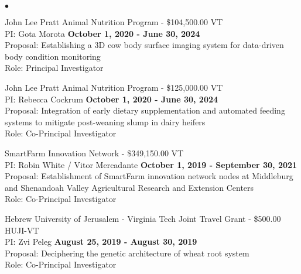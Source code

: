\documentclass[margin,line,10pt]{res}
\newenvironment{list2}{
  \begin{list}{$\bullet$}{%
      \setlength{\itemsep}{0in}
      \setlength{\parsep}{0in} \setlength{\parskip}{0in}
      \setlength{\topsep}{0in} \setlength{\partopsep}{0in} 
      \setlength{\leftmargin}{0.2in}}}{\end{list}}
\begin{document}
\begin{resume}
\begin{list2}
\vspace{0.5cm}

\item John Lee Pratt Animal Nutrition Program - \$104,500.00  \hfill VT\\
PI: Gota Morota \hfill \textbf{October 1, 2020 - June 30, 2024}\\
Proposal: Establishing a 3D cow body surface imaging system for data-driven body condition monitoring\\
Role: Principal Investigator \\


\vspace{0.5cm}


\item John Lee Pratt Animal Nutrition Program - \$125,000.00  \hfill VT\\
PI: Rebecca Cockrum \hfill \textbf{October 1, 2020 - June 30, 2024}\\
Proposal: Integration of early dietary supplementation and automated feeding systems to mitigate post-weaning slump in dairy heifers\\
Role: Co-Principal Investigator \\

\vspace{0.5cm}


\item SmartFarm Innovation Network - \$349,150.00  \hfill VT\\
PI: Robin White / Vitor Mercadante  \hfill \textbf{October 1, 2019 - September 30, 2021}\\
Proposal: Establishment of SmartFarm innovation network nodes at Middleburg and Shenandoah Valley Agricultural Research and Extension Centers \\
Role: Co-Principal Investigator \\

\vspace{0.5cm}


\item  Hebrew University of Jerusalem - Virginia Tech Joint Travel Grant - \$500.00  \hfill HUJI-VT\\
PI: Zvi Peleg  \hfill \textbf{August 25, 2019 - August 30, 2019}\\
Proposal: Deciphering the genetic architecture of wheat root system \\
Role: Co-Principal Investigator \\


\vspace{0.5cm}




\end{list2}
\end{resume}
\end{document}
